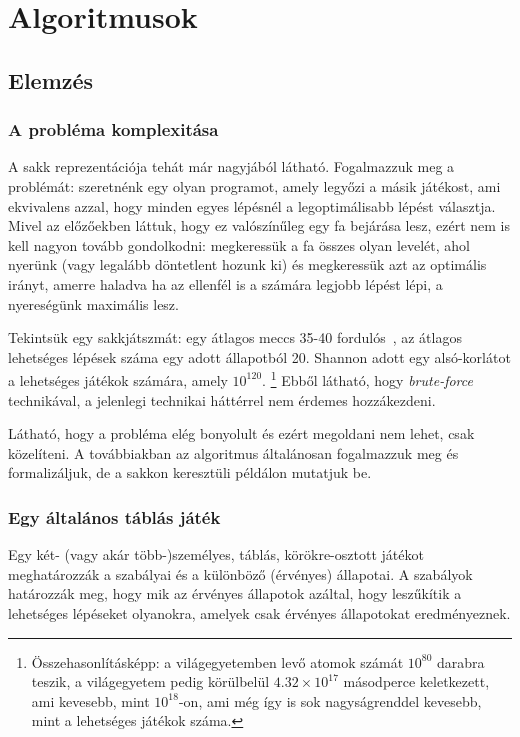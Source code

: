 \documentclass[twoside, a4paper, 12pt]{article}
\begin{document}
\newpage
\section{Algoritmusok}
\subsection{Elemzés}
\subsubsection{A probléma komplexitása}
A sakk reprezentációja tehát már nagyjából látható. Fogalmazzuk meg a problémát: szeretnénk egy olyan programot, amely legyőzi a másik játékost, ami ekvivalens azzal, hogy minden egyes lépésnél a legoptimálisabb lépést választja. Mivel az előzőekben láttuk, hogy ez valószínűleg egy fa bejárása lesz, ezért nem is kell nagyon tovább gondolkodni: megkeressük a fa összes olyan levelét, ahol nyerünk (vagy legalább döntetlent hozunk ki) és megkeressük azt az optimális irányt, amerre haladva ha az ellenfél is a számára legjobb lépést lépi, a nyereségünk maximális lesz.

Tekintsük egy sakkjátszmát: egy átlagos meccs 35-40 fordulós~\cite{averageLengthOfChessGame}\cite{averageLengthOfChessGame2}\cite{chessStatistics}, az átlagos lehetséges lépések száma egy adott állapotból 20\cite{shannonnumber}. Shannon adott egy alsó-korlátot a lehetséges játékok számára, amely $10^{120}$. \footnote{Összehasonlításképp: a világegyetemben levő atomok számát $10^{80}$ darabra teszik, a világegyetem pedig körülbelül $4.32 \times 10^{17}$ másodperce keletkezett, ami kevesebb, mint $10^{18}$-on, ami még így is sok nagyságrenddel kevesebb, mint a lehetséges játékok száma.} Ebből látható, hogy \textit{brute-force} technikával, a jelenlegi technikai háttérrel nem érdemes hozzákezdeni.

Látható, hogy a probléma elég bonyolult és ezért megoldani nem lehet, csak közelíteni. A továbbiakban az algoritmus általánosan fogalmazzuk meg és formalizáljuk, de a sakkon keresztüli példálon mutatjuk be.

\subsubsection{Egy általános táblás játék}
Egy két- (vagy akár több-)személyes, táblás, körökre-osztott játékot meghatározzák a szabályai és a különböző (érvényes) állapotai. A szabályok határozzák meg, hogy mik az érvényes állapotok azáltal, hogy leszűkítik a lehetséges lépéseket olyanokra, amelyek csak érvényes állapotokat eredményeznek.
\end{document}
